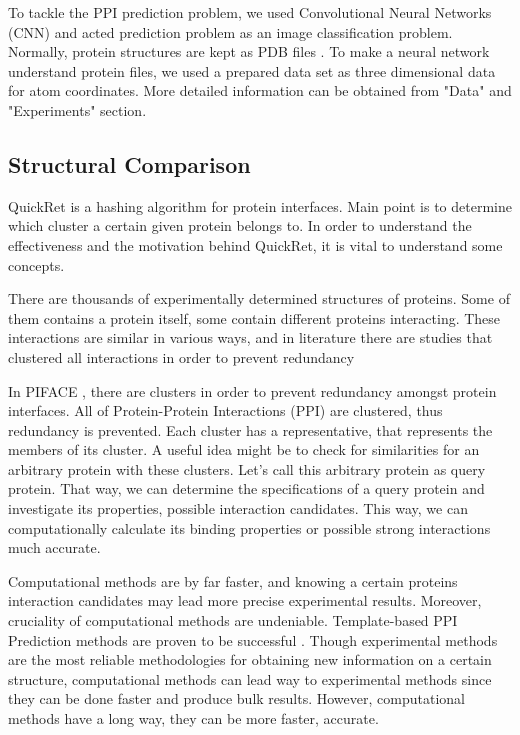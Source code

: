 \documentclass{article}
\begin{document}
To tackle the PPI prediction problem, we used Convolutional Neural Networks (CNN) and acted prediction problem as an image classification problem. Normally, protein structures are kept as PDB files \citep{10.1093/nar/gky1004}. To make a neural network understand protein files, we used a prepared data set as three dimensional data for atom coordinates. More detailed information can be obtained from "Data" and "Experiments" section.

\subsection{Structural Comparison}
QuickRet is a hashing algorithm for protein interfaces. Main point is to determine which cluster a certain given protein belongs to. In order to understand the effectiveness and the motivation behind QuickRet, it is vital to understand some concepts.

There are thousands of experimentally determined structures of proteins. Some of them contains a protein itself, some contain different proteins interacting. These interactions are similar in various ways, and in literature there are studies that clustered all interactions in order to prevent redundancy \citep{RN5}

In PIFACE \citep{RN5}, there are clusters in order to prevent redundancy amongst protein interfaces. All of Protein-Protein Interactions (PPI) are clustered, thus redundancy is prevented. Each cluster has a representative, that represents the members of its cluster. A useful idea might be to check for similarities for an arbitrary protein with these clusters. Let's call this arbitrary protein as query protein. That way, we can determine the specifications of a query protein and investigate its properties, possible interaction candidates. This way, we can computationally calculate its binding properties or possible strong interactions much accurate.

Computational methods are by far faster, and knowing a certain proteins interaction candidates may lead more precise experimental results. Moreover, cruciality of computational methods are undeniable. Template-based PPI Prediction methods are proven to be successful \citep{baspinar2014prism} \citep{tuncbag2011predicting}. Though experimental methods are the most reliable methodologies for obtaining new information on a certain structure, computational methods can lead way to experimental methods since they can be done faster and produce bulk results. However, computational methods have a long way, they can be more faster, accurate.
\end{document}
